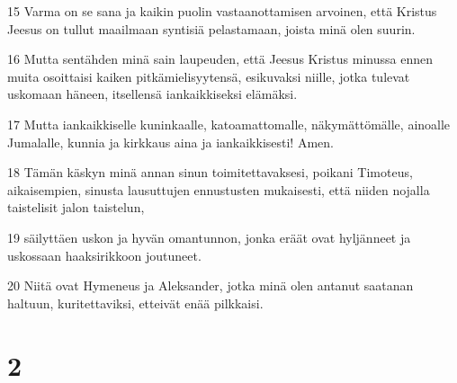 \par 15 Varma on se sana ja kaikin puolin vastaanottamisen arvoinen, että Kristus Jeesus on tullut maailmaan syntisiä pelastamaan, joista minä olen suurin.
\par 16 Mutta sentähden minä sain laupeuden, että Jeesus Kristus minussa ennen muita osoittaisi kaiken pitkämielisyytensä, esikuvaksi niille, jotka tulevat uskomaan häneen, itsellensä iankaikkiseksi elämäksi.
\par 17 Mutta iankaikkiselle kuninkaalle, katoamattomalle, näkymättömälle, ainoalle Jumalalle, kunnia ja kirkkaus aina ja iankaikkisesti! Amen.
\par 18 Tämän käskyn minä annan sinun toimitettavaksesi, poikani Timoteus, aikaisempien, sinusta lausuttujen ennustusten mukaisesti, että niiden nojalla taistelisit jalon taistelun,
\par 19 säilyttäen uskon ja hyvän omantunnon, jonka eräät ovat hyljänneet ja uskossaan haaksirikkoon joutuneet.
\par 20 Niitä ovat Hymeneus ja Aleksander, jotka minä olen antanut saatanan haltuun, kuritettaviksi, etteivät enää pilkkaisi.

\chapter{2}

